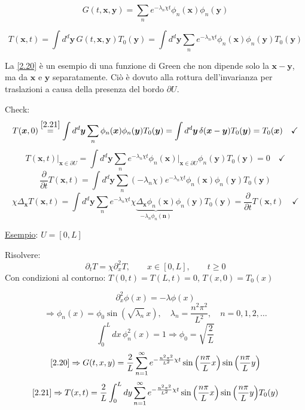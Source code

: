\documentclass[a4paper,11pt]{report}
\newcommand{\x}{\boldsymbol{x}}
\newcommand{\y}{\boldsymbol{y}}
\newcommand{\n}{\boldsymbol{n}}
\begin{document}
\begin{equation}
G(t,\x,\y)=\sum_{n}e^{-\lambda_n\chi t}\phi_n(\x)\phi_n(\y )
\label{2.20}
\end{equation}

\begin{equation}
T(\x,t)=\int d^d\y\, G(t,\x,\y)T_0(\y )=\int d^d \y \sum_{n}e^{-\lambda_n\chi t}\phi_n(\x)\phi_n(\y )T_0(\y )
\label{2.21}
\end{equation}

La \eqref{2.20} \`e un esempio di una funzione di Green che non dipende solo la $\x-\y $, ma da $\x$ e $\y $ separatamente. 
Ci\`o \`e dovuto alla rottura dell'invarianza per traslazioni a causa della presenza del bordo $\partial U$.

\medskip

Check: 
\[
T(\x,0)\overset{\eqref{2.21}}{=}\int d^d \y \sum_{n}\phi_n(\x)\phi_n(\y )T_0(\y )=\int d^d\y\, \delta(\x-\y )T_0(\y )=T_0(\x) \quad \checkmark
\]
\[
T(\x,t)\Big|_{\x\in\partial U}=\int d^d\y \sum_n e^{-\lambda_n \chi t} \phi_n(\x)\Big|_{\x\in\partial U}\phi_n(\y )T_0(\y )=0 \quad \checkmark
\]
\[
\frac{\partial}{\partial t}T(\x,t)=\int d^d\y \sum_n (-\lambda_n \chi)e^{-\lambda_n\chi t} \phi_n(\x)\phi_n(\y )T_0(\y )
\]
\[
\chi\Delta_{\x}T(\x,t)=\int d^d \y  \sum_n e^{-\lambda_n \chi t}\chi \underbrace{\Delta_{\x}\phi_n(\x)}_{-\lambda_n \phi_n(\n)} \phi_n(\y )T_0(\y )=\frac{\partial}{\partial t}T(\x,t) \quad \checkmark
\]

\medskip

\underline{Esempio}: $U=[0,L]$

Risolvere:
\[
\partial_t T=\chi\partial_{x}^2T, \qquad x\in[0,L], \qquad t\geq0
\]
Con condizioni al contorno: $T(0,t)=T(L,t)=0$, $T(x,0)=T_0(x)$

\[
\partial^{2}_{x}\phi(x)=-\lambda\phi(x) 
\]
\[
\Rightarrow \phi_n(x)=\phi_0\sin{\left(\sqrt{\lambda_n}\, x\right)},\quad \lambda_n=\frac{n^2\pi^2}{L^2}, \quad n=0,1,2,\dots
\]
\[
\int_0^L dx\, \phi^2_n(x)=1\Rightarrow\phi_0=\sqrt{\frac{2}{L}}
\]
\begin{equation}
\eqref{2.20}\Rightarrow G(t,x,y)=\frac{2}{L}\sum_{n=1}^{\infty}e^{-\frac{n^2\pi^2}{L^2}\chi t}\sin{\left(\frac{n\pi}{L}x\right)}\sin{\left(\frac{n\pi}{L}y\right)}
\label{2.22}
\end{equation}
\begin{equation}
\eqref{2.21}\Rightarrow T(x,t)=\frac{2}{L}\int_0^L dy\sum_{n=1}^{\infty}e^{-\frac{n^2\pi^2}{L^2}\chi t} \sin{\left(\frac{n\pi}{L}x\right)}\sin{\left(\frac{n\pi}{L}y\right)} T_0(y)
\label{2.23}
\end{equation}
\end{document}
